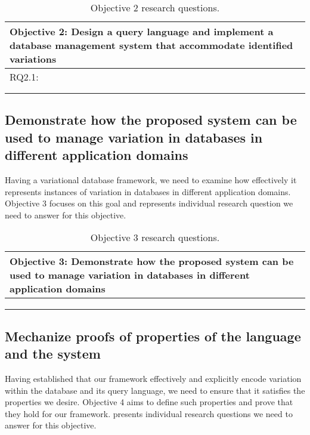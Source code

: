 \begin{table}
\caption{Objective 2 research questions.}
\label{tab:ro2}
\centering
\begin{tabularx}{\textwidth}{X}
\toprule
 \textbf{Objective 2: Design a query language and implement a database management 
system that accommodate identified variations}
\tabularnewline
\midrule
RQ2.1: 
\tabularnewline[0.2cm]
\tabularnewline[0.2cm]

\tabularnewline
\bottomrule
\end{tabularx}
\end{table}


\subsection{Demonstrate how the proposed system can be used to manage
variation in databases in different application domains}
\label{sec:ro3}

Having a variational database framework, we need to examine how effectively
it represents instances of variation in databases in different application domains.
Objective 3 focuses on this goal and  represents individual research 
question we need to answer for this objective.

\begin{table}
\caption{Objective 3 research questions.}
\label{tab:ro3}
\centering
\begin{tabularx}{\textwidth}{X}
\toprule
 \textbf{Objective 3: Demonstrate how the proposed system can be used to manage
variation in databases in different application domains}
\tabularnewline
\midrule
\tabularnewline[0.2cm]
\tabularnewline[0.2cm]

\tabularnewline
\bottomrule
\end{tabularx}
\end{table}

\subsection{Mechanize proofs of properties of the language and the system}
\label{sec:ro4}

Having established that our framework  effectively and explicitly encode variation 
within the database and its query language, we need to ensure that it satisfies
the properties we desire. Objective 4 aims to define such properties and
prove that they hold for our framework. 
 presents
individual research questions we need to answer for this objective. 



